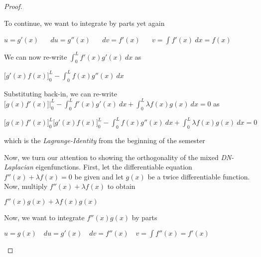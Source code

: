 \documentclass[executivepaper]{article}
\begin{document}
\begin{flushleft}
\begin{proof}
\begin{center}
\end{center}

To continue, we want to integrate by parts yet again

\begin{center}

$u=g'(x)$ $\quad$ $du=g''(x)$ $\quad$ $dv=f'(x)$ $\quad$ $v=\int f'(x) \ dx= f(x)$

\end{center}

We can now re-write  $\int_{0}^{L} f'(x)g'(x) \ dx$ as

\begin{center}

$\bigg[g'(x)f(x)\bigg]_{0}^{L} - \int_{0}^{L} f(x)g''(x) \ dx$

\end{center}

Substituting back-in, we can re-write $\bigg[g(x)f'(x)\bigg] \bigg|_{0}^{L} - \int_{0}^{L} f'(x)g'(x) \ dx + \int_{0}^{L} \lambda f(x)g(x) \ dx=0$ as

\begin{center}

$\bigg[g(x)f'(x)\bigg]_{0}^{L}\bigg[g'(x)f(x)\bigg]_{0}^{L} - \int_{0}^{L} f(x)g''(x) \ dx+ \int_{0}^{L} \lambda f(x)g(x) \ dx=0$

\end{center}

which is the \textit{Lagrange-Identity} from the beginning of the semester

\vspace{5mm}

Now, we turn our attention to showing the orthogonality of the mixed \textit{DN-Laplacian} eigenfunctions. First, let the differentiable equation $f''(x)+\lambda f(x)=0$ be given and let $g(x)$ be a twice differentiable function. Now, multiply $f''(x)+\lambda f(x)$ to obtain

\begin{center}

$f''(x)g(x)+\lambda f(x)g(x)$

\end{center}

Now, we want to integrate $f''(x)g(x)$ by parts

\begin{center}

$u=g(x) \quad du=g'(x) \quad dv=f''(x) \quad v=\int f''(x)=f'(x)$

\end{center}


\end{proof}
\end{flushleft}
\end{document}
